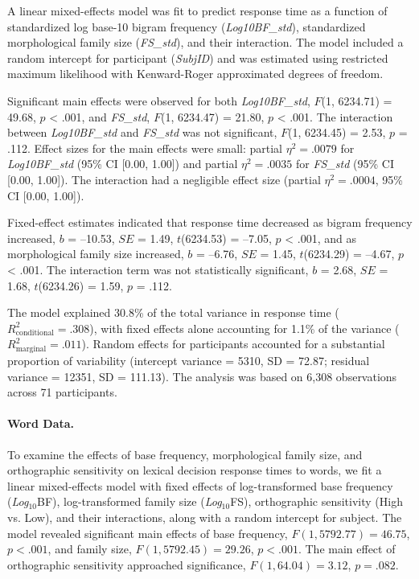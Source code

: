 \documentclass[preprint,12pt, authoryear, review]{elsarticle}
\begin{document}
A linear mixed-effects model was fit to predict response time as a function of standardized log base-10 bigram frequency (\textit{Log10BF\_std}), standardized morphological family size (\textit{FS\_std}), and their interaction. The model included a random intercept for participant (\textit{SubjID}) and was estimated using restricted maximum likelihood with Kenward-Roger approximated degrees of freedom.

Significant main effects were observed for both \textit{Log10BF\_std}, $F$(1, 6234.71) = 49.68, $p$ < .001, and \textit{FS\_std}, $F$(1, 6234.47) = 21.80, $p$ < .001. The interaction between \textit{Log10BF\_std} and \textit{FS\_std} was not significant, $F$(1, 6234.45) = 2.53, $p$ = .112. Effect sizes for the main effects were small: partial $\eta^2 = .0079$ for \textit{Log10BF\_std} (95\% CI [0.00, 1.00]) and partial $\eta^2 = .0035$ for \textit{FS\_std} (95\% CI [0.00, 1.00]). The interaction had a negligible effect size (partial $\eta^2 = .0004$, 95\% CI [0.00, 1.00]).

Fixed-effect estimates indicated that response time decreased as bigram frequency increased, $b$ = --10.53, $SE$ = 1.49, $t$(6234.53) = --7.05, $p$ < .001, and as morphological family size increased, $b$ = --6.76, $SE$ = 1.45, $t$(6234.29) = --4.67, $p$ < .001. The interaction term was not statistically significant, $b$ = 2.68, $SE$ = 1.68, $t$(6234.26) = 1.59, $p$ = .112.

The model explained 30.8\% of the total variance in response time ($R^2_\text{conditional} = .308$), with fixed effects alone accounting for 1.1\% of the variance ($R^2_\text{marginal} = .011$). Random effects for participants accounted for a substantial proportion of variability (intercept variance = 5310, SD = 72.87; residual variance = 12351, SD = 111.13). The analysis was based on 6{,}308 observations across 71 participants.

\paragraph{Word Data.} To examine the effects of base frequency, morphological family size, and orthographic sensitivity on lexical decision response times to words, we fit a linear mixed-effects model with fixed effects of log-transformed base frequency (\textit{Log}$_{10}$BF), log-transformed family size (\textit{Log}$_{10}$FS), orthographic sensitivity (High vs. Low), and their interactions, along with a random intercept for subject. The model revealed significant main effects of base frequency, $F(1, 5792.77) = 46.75$, $p < .001$, and family size, $F(1, 5792.45) = 29.26$, $p < .001$. The main effect of orthographic sensitivity approached significance, $F(1, 64.04) = 3.12$, $p = .082$.
\end{document}
